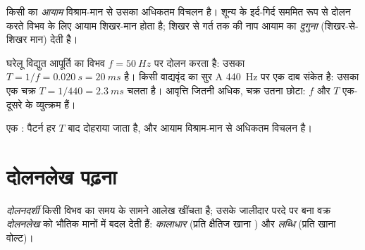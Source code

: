 \begin{definition}[आयाम]\label{def:g10:signals-and-waves:amplitude}
किसी  का \emph{आयाम} विश्राम-मान से उसका
अधिकतम विचलन है। शून्य के इर्द-गिर्द सममित रूप से दोलन करते विभव के लिए
आयाम शिखर-मान होता है; शिखर से गर्त तक की नाप आयाम का \emph{दुगुना}
(शिखर-से-शिखर मान) देती है।
\end{definition}

\begin{example}[विद्युत आपूर्ति और संगीत का सुर]\label{ex:g10:signals-and-waves:mains}
घरेलू विद्युत आपूर्ति का विभव $f = \qty{50}{Hz}$ पर दोलन करता है: उसका
 $T = 1/f = \qty{0.020}{s} = \qty{20}{ms}$ है। किसी वाद्यवृंद का सुर A \qty{440}{Hz} पर एक
दाब संकेत है: उसका एक चक्र $T = 1/440 = \qty{2.3}{ms}$ चलता है। आवृत्ति
जितनी अधिक, चक्र उतना छोटा: $f$ और $T$ एक-दूसरे के व्युत्क्रम हैं।
\end{example}

\begin{omfigure}

{\small एक : पैटर्न हर $T$  बाद दोहराया जाता
है, और आयाम विश्राम-मान से अधिकतम विचलन है।}
\end{omfigure}

\section{दोलनलेख पढ़ना}

\begin{definition}[दोलनदर्शी]\label{def:g10:signals-and-waves:oscilloscope}
\emph{दोलनदर्शी} किसी विभव का समय के सामने आलेख खींचता
है; उसके जालीदार परदे पर बना वक्र
\emph{दोलनलेख}%
को भौतिक मानों में बदल देती हैं: \emph{कालाधार} (प्रति
क्षैतिज खाना ) और  \emph{लब्धि} (प्रति
 खाना वोल्ट)।
\end{definition}

